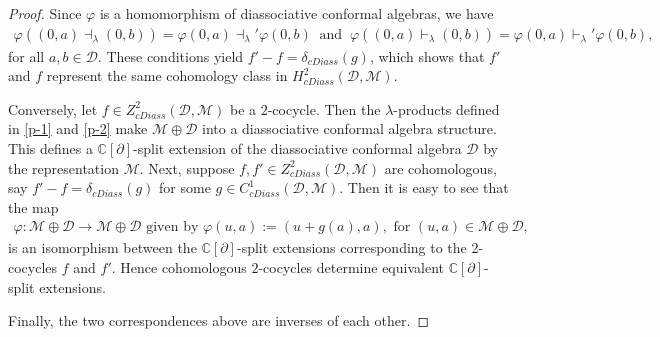 \documentclass[10pt,a4paper]{amsart}
\newcommand{\D}{\mathcal{D}}
\newcommand{\M}{\mathcal{M}}
\newcommand{\la}{\lambda}
\begin{document}
\begin{proof}
Since $\varphi$ is a homomorphism of diassociative conformal algebras, we have
\begin{align*}
\varphi ((0,a)\dashv_{\la}(0,b) )
=
\varphi  (0,a)\dashv_{\la}' \varphi (0,b)~
\text{ and }~
\varphi ((0,a)\vdash_{\la}(0,b) )
=
\varphi (0,a)\vdash_{\la}' \varphi (0,b ),
\end{align*}
for all $a, b \in \D$. These conditions yield $f'-f=\delta_{cDiass}(g)$, which shows that $f'$ and $f$ represent the same cohomology class in $H_{cDiass}^{2}(\D,\M)$.

\medskip

Conversely, let $f\in Z_{cDiass}^{2}(\D,\M)$ be a $2$-cocycle. Then the $\la$-products defined in \eqref{p-1} and \eqref{p-2} make $\M\oplus\D$ into a diassociative conformal algebra structure. This defines a $\mathbb{C}[\partial]$-split extension of the diassociative conformal algebra $\D$ by the representation $\M$. Next, suppose $f, f' \in  Z_{cDiass}^{2}(\D,\M)$ are cohomologous, say $ f'- f = \delta_{cDiass}(g)$ for some $g\in C_{cDiass}^{1}(\D,\M)$. Then it is easy to see that the map
\begin{align*}
\varphi: \M\oplus\D\longrightarrow\M\oplus\D  \text{ given by }
\varphi(u, a) :=(u+g(a),a), \text{ for } (u, a) \in \M \oplus \D,
\end{align*}
is an isomorphism between the $\mathbb{C}[\partial]$-split extensions corresponding to the 2-cocycles $f$ and $f'$. Hence cohomologous $2$-cocycles determine equivalent $\mathbb{C}[\partial]$-split extensions. 

Finally, the two correspondences above are inverses of each other.
\end{proof}
\end{document}
